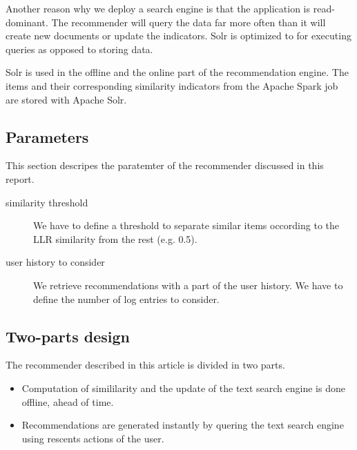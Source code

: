 Another reason why we deploy a search engine is that the application is read-dominant. The recommender will query the data far more often than it will create new documents or update the indicators. Solr is optimized to for executing queries as opposed to storing data.

Solr is used in the offline and the online part of the recommendation engine.
The items and their corresponding similarity indicators from the Apache Spark job are stored with Apache Solr. 

\subsection{Parameters}
\label{sec:parameters}

This section descripes the paratemter of the recommender discussed in this report.
\begin{description}
\item[similarity threshold] We have to define a threshold to separate similar items occording to the LLR similarity from the rest (e.g. 0.5).
\item[user history to consider] We retrieve recommendations with a part of the user history. We have to define the number of log entries to consider.
\end{description}

\subsection{Two-parts design}

The recommender described in this article is divided in two parts.
\begin{itemize}
\item Computation of simililarity and the update of the text search engine is done offline, ahead of time.
\item Recommendations are generated instantly by quering the text search engine using rescents actions of the user.
\end{itemize}
